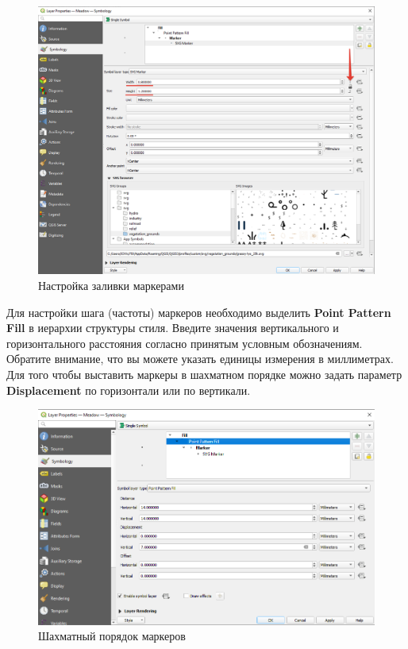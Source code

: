 \documentclass[
  12pt,
]{book}
\begin{document}
\begin{figure}
\centering
\includegraphics{images/Practice/SVG_filling.png}
\caption{Настройка заливки маркерами}
\end{figure}

Для настройки шага (частоты) маркеров необходимо выделить \textbf{Point Pattern Fill} в иерархии структуры стиля. Введите значения вертикального и горизонтального расстояния согласно принятым условным обозначениям. Обратите внимание, что вы можете указать единицы измерения в миллиметрах. Для того чтобы выставить маркеры в шахматном порядке можно задать параметр \textbf{Displacement} по горизонтали или по вертикали.

\begin{figure}
\centering
\includegraphics{images/Practice/Chess_filling.png}
\caption{Шахматный порядок маркеров}
\end{figure}
\end{document}
